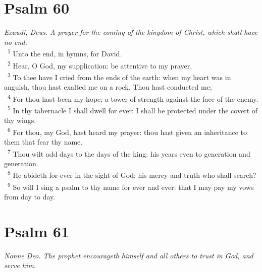 \documentclass[a5paper,12pt]{article}
\begin{document}
\begin{multicols*}{2}
\section{Psalm 60}
\label{sec:orga433725}
\emph{Exaudi, Deus. A prayer for the coming of the kingdom of Christ, which shall have no end.}\\

~\textsuperscript{1} Unto the end, in hymns, for David.\\
~\textsuperscript{2} Hear, O God, my supplication: be attentive to my prayer,\\
~\textsuperscript{3} To thee have I cried from the ends of the earth: when my heart was in anguish, thou hast exalted me on a rock. Thou hast conducted me;\\
~\textsuperscript{4} For thou hast been my hope; a tower of strength against the face of the enemy.\\
~\textsuperscript{5} In thy tabernacle I shall dwell for ever: I shall be protected under the covert of thy wings.\\
~\textsuperscript{6} For thou, my God, hast heard my prayer: thou hast given an inheritance to them that fear thy name.\\
~\textsuperscript{7} Thou wilt add days to the days of the king: his years even to generation and generation.\\
~\textsuperscript{8} He abideth for ever in the sight of God: his mercy and truth who shall search?\\
~\textsuperscript{9} So will I sing a psalm to thy name for ever and ever: that I may pay my vows from day to day.\\

\section{Psalm 61}
\label{sec:orgc6cf9c8}
\emph{Nonne Deo. The prophet encourageth himself and all others to trust in God, and serve him.}\\


\end{multicols*}
\end{document}
